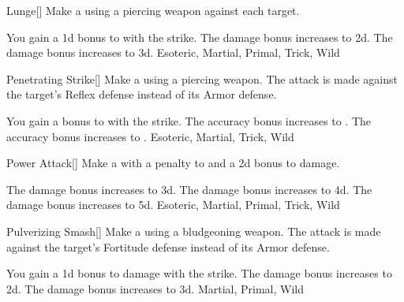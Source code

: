 \lowercase{\hypertarget{maneuver:Lunge}{}}\label{maneuver:Lunge}
\hypertarget{maneuver:Lunge}{}
\begin{freeability}[Rank 1]{Lunge}[]
Make a  using a piercing weapon against each target.

\rankline
{} You gain a \plus1d bonus to  with the strike.
 The damage bonus increases to \plus2d.
 The damage bonus increases to \plus3d.
 Esoteric, Martial, Primal, Trick, Wild
\end{freeability}
\vspace{0.25em}



\lowercase{\hypertarget{maneuver:Penetrating Strike}{}}\label{maneuver:Penetrating Strike}
\hypertarget{maneuver:Penetrating Strike}{}
\begin{freeability}[Rank 1]{Penetrating Strike}[]
Make a  using a piercing weapon.
The attack is made against the target's Reflex defense instead of its Armor defense.

\rankline
{} You gain a  bonus to  with the strike.
 The accuracy bonus increases to .
 The accuracy bonus increases to .
 Esoteric, Martial, Trick, Wild
\end{freeability}
\vspace{0.25em}



\lowercase{\hypertarget{maneuver:Power Attack}{}}\label{maneuver:Power Attack}
\hypertarget{maneuver:Power Attack}{}
\begin{freeability}[Rank 1]{Power Attack}[]
Make a  with a  penalty to  and a \plus2d bonus to damage.

\rankline
{} The damage bonus increases to \plus3d.
 The damage bonus increases to \plus4d.
 The damage bonus increases to \plus5d.
 Esoteric, Martial, Primal, Trick, Wild
\end{freeability}
\vspace{0.25em}



\lowercase{\hypertarget{maneuver:Pulverizing Smash}{}}\label{maneuver:Pulverizing Smash}
\hypertarget{maneuver:Pulverizing Smash}{}
\begin{freeability}[Rank 1]{Pulverizing Smash}[]
Make a  using a bludgeoning weapon.
The attack is made against the target's Fortitude defense instead of its Armor defense.

\rankline
{} You gain a \plus1d bonus to damage with the strike.
 The damage bonus increases to \plus2d.
 The damage bonus increases to \plus3d.
 Martial, Primal, Wild
\end{freeability}
\vspace{0.25em}




